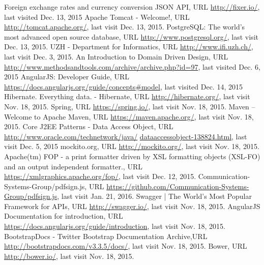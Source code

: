 \begin{thebibliography}{99}

 Foreign exchange rates and currency conversion JSON API, URL \url{http://fixer.io/}, last visited Dec. 13, 2015
 Apache Tomcat - Welcome!, URL \url{http://tomcat.apache.org/}, last visit Dec. 13, 2015.
 PostgreSQL: The world's most advanced open source database, URL \url{http://www.postgresql.org/}, last visit Dec. 13, 2015.
 UZH - Department for Informatics, URL \url{http://www.ifi.uzh.ch/}, last visit Dec. 3, 2015.
 An Introduction to Domain Driven Design, URL \url{http://www.methodsandtools.com/archive/archive.php?id=97}, last visited Dec. 6, 2015
 AngularJS: Developer Guide, \newline URL \url{https://docs.angularjs.org/guide/concepts#model}, last visited Dec. 14, 2015
 Hibernate. Everything data. - Hibernate, URL \url{http://hibernate.org/}, last visit Nov. 18, 2015.
 Spring, URL \url{https://spring.io/}, last visit Nov. 18, 2015.
 Maven – Welcome to Apache Maven, URL \url{https://maven.apache.org/}, last visit Nov. 18, 2015.
 Core J2EE Patterns - Data Access Object, \newline URL \url{http://www.oracle.com/technetwork/java/} \newline \url{dataaccessobject-138824.html}, last visit Dec. 5, 2015
 mockito.org, URL \url{http://mockito.org/}, last visit Nov. 18, 2015.
 Apache(tm) FOP - a print formatter driven by XSL formatting objects (XSL-FO) and an output independent formatter., URL \url{https://xmlgraphics.apache.org/fop/}, last visit Dec. 12, 2015.
 Communication-Systems-Group/pdfsign.js, \newline URL \url{https://github.com/Communication-Systems-Group/pdfsign.js}, last visit Jan. 21, 2016.
 Swagger | The World's Most Popular Framework for APIs, URL \url{http://swagger.io/}, last visit Nov. 18, 2015.
 AngularJS Documentation for introduction, URL \url{https://docs.angularjs.org/guide/introduction}, last visit Nov. 18, 2015.
 BootstrapDocs - Twitter Bootstrap Documentation Archive,\newline URL \url{http://bootstrapdocs.com/v3.3.5/docs/}, last visit Nov. 18, 2015.
 Bower, URL \url{http://bower.io/}, last visit Nov. 18, 2015.

\end{thebibliography}
